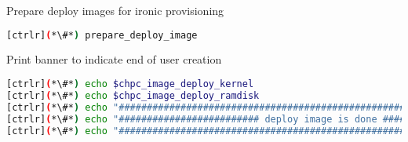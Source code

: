 	
	Prepare deploy images for ironic provisioning 

\begin{lstlisting}[language=bash,keywords={},upquote=true]
[ctrlr](*\#*) prepare_deploy_image
\end{lstlisting}

	
	Print banner to indicate end of user creation

\begin{lstlisting}[language=bash,keywords={},upquote=true]
[ctrlr](*\#*) echo $chpc_image_deploy_kernel
[ctrlr](*\#*) echo $chpc_image_deploy_ramdisk
[ctrlr](*\#*) echo "########################################################################"
[ctrlr](*\#*) echo "######################### deploy image is done #########################"
[ctrlr](*\#*) echo "########################################################################"
\end{lstlisting}


